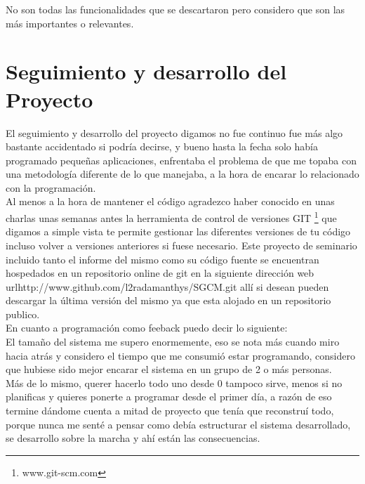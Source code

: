 No son todas las funcionalidades que se descartaron pero considero que son las más importantes o relevantes.

\section{Seguimiento y desarrollo del Proyecto}

El seguimiento y desarrollo del proyecto digamos no fue continuo fue más algo bastante accidentado si podría decirse, y bueno hasta la fecha solo había programado pequeñas aplicaciones, enfrentaba el problema de que me topaba con una metodología diferente de lo que manejaba, a la hora de encarar lo relacionado con la programación. \\[0.1cm]

Al menos a la hora de mantener el código agradezco haber conocido en unas charlas unas semanas antes la herramienta de control de versiones GIT \footnote{www.git-scm.com} que digamos a simple vista te permite gestionar las diferentes versiones de tu código incluso volver a versiones anteriores si fuese necesario. Este proyecto de seminario incluido tanto el informe del mismo como su código fuente se encuentran hospedados
en un repositorio online de git en la siguiente dirección web url{http://www.github.com/l2radamanthys/SGCM.git} allí si desean pueden descargar la última versión del mismo ya que esta alojado en un repositorio publico.\\[0.1cm]

En cuanto a programación como feeback puedo decir lo siguiente: \\[0.1cm]

El tamaño del sistema me supero enormemente, eso se nota más cuando miro hacia atrás y considero el tiempo que me consumió estar programando, considero que hubiese sido mejor encarar el sistema en un grupo de 2 o más personas. \\[0.1cm]

Más de lo mismo, querer hacerlo todo uno desde 0 tampoco sirve, menos si no planificas y quieres ponerte a programar desde el primer día, a razón de eso termine dándome cuenta a mitad de proyecto que tenía que reconstruí todo, porque nunca me senté a pensar como debía estructurar el sistema desarrollado, se desarrollo sobre la marcha y ahí están las consecuencias.


